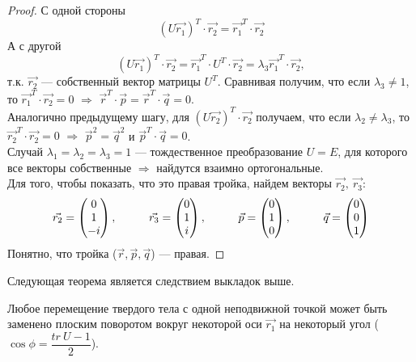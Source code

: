 \begin{proof}
    С одной стороны
    \[
    (U\vec{r_1})^T\cdot \vec{r_2} = \vec{r_1}^T\cdot \vec{r_2}
    \]
    А с другой
    \[
    (U\vec{r_1})^T\cdot \vec{r_2} = \vec{r_1}^T \cdot U^T \cdot \vec{r_2} = \lambda_3 \vec{r_1}^T \cdot \vec{r_2},
    \]
    т.к. $\vec{r_2}$ --- собственный вектор матрицы $U^T$. Сравнивая получим, что если $\lambda_3 \neq 1$, то $\vec{r_1}^T \cdot \vec{r_2} = 0$ $\Longrightarrow$ $\vec{r}^T\cdot\vec{p} = \vec{r}^T\cdot\vec{q} = 0$.\\
    Аналогично предыдущему шагу, для $(U\vec{r_2})^T\cdot \vec{r_2}$ получаем, что если $\lambda_2 \neq \lambda_3$, то $\vec{r_2}^T\cdot\vec{r_2} = 0$ $\Longrightarrow$ $\vec{p}^2 = \vec{q}^2$ и $\vec{p}^T\cdot \vec{q} = 0$.\\

    Случай $\lambda_1 = \lambda_2 = \lambda_3 = 1$ --- тождественное преобразование $U = E$, для которого все векторы собственные $\Longrightarrow$ найдутся взаимно ортогональные.\\

    Для того, чтобы показать, что это правая тройка, найдем векторы $\vec{r_2},~\vec{r_3}$:
    \[
    \vec{r_2} = \begin{pmatrix}
        0\\1\\-i\\
    \end{pmatrix}, \hspace*{1cm} \vec{r_3} = \begin{pmatrix}
        0\\1\\i\\
    \end{pmatrix}, \hspace*{1cm} \vec{p} = \begin{pmatrix}
        0\\1\\0\\
    \end{pmatrix}, \hspace*{1cm} \vec{q} = \begin{pmatrix}
        0\\0\\1\\
    \end{pmatrix}
    \]
    Понятно, что тройка ($\vec{r}, \vec{p}, \vec{q}$) --- правая.
\end{proof}

Следующая теорема является следствием выкладок выше.
\begin{theorem}
    Любое перемещение твердого тела с одной неподвижной точкой может быть заменено плоским поворотом вокруг некоторой оси $\vec{r_1}$ на некоторый угол ($\cos{\phi} = \dfrac{tr~U - 1}{2}$).
\end{theorem}

